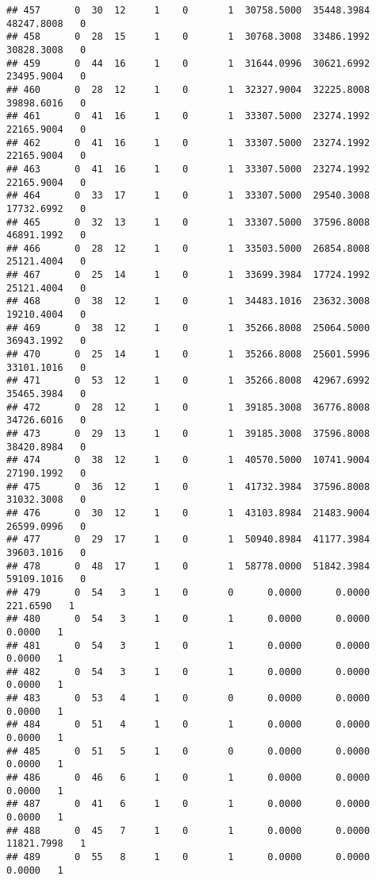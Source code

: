 \documentclass[
]{article}
\begin{document}
\begin{enumerate}
\begin{verbatim}
## 457      0  30  12     1    0       1  30758.5000  35448.3984  48247.8008   0
## 458      0  28  15     1    0       1  30768.3008  33486.1992  30828.3008   0
## 459      0  44  16     1    0       1  31644.0996  30621.6992  23495.9004   0
## 460      0  28  12     1    0       1  32327.9004  32225.8008  39898.6016   0
## 461      0  41  16     1    0       1  33307.5000  23274.1992  22165.9004   0
## 462      0  41  16     1    0       1  33307.5000  23274.1992  22165.9004   0
## 463      0  41  16     1    0       1  33307.5000  23274.1992  22165.9004   0
## 464      0  33  17     1    0       1  33307.5000  29540.3008  17732.6992   0
## 465      0  32  13     1    0       1  33307.5000  37596.8008  46891.1992   0
## 466      0  28  12     1    0       1  33503.5000  26854.8008  25121.4004   0
## 467      0  25  14     1    0       1  33699.3984  17724.1992  25121.4004   0
## 468      0  38  12     1    0       1  34483.1016  23632.3008  19210.4004   0
## 469      0  38  12     1    0       1  35266.8008  25064.5000  36943.1992   0
## 470      0  25  14     1    0       1  35266.8008  25601.5996  33101.1016   0
## 471      0  53  12     1    0       1  35266.8008  42967.6992  35465.3984   0
## 472      0  28  12     1    0       1  39185.3008  36776.8008  34726.6016   0
## 473      0  29  13     1    0       1  39185.3008  37596.8008  38420.8984   0
## 474      0  38  12     1    0       1  40570.5000  10741.9004  27190.1992   0
## 475      0  36  12     1    0       1  41732.3984  37596.8008  31032.3008   0
## 476      0  30  12     1    0       1  43103.8984  21483.9004  26599.0996   0
## 477      0  29  17     1    0       1  50940.8984  41177.3984  39603.1016   0
## 478      0  48  17     1    0       1  58778.0000  51842.3984  59109.1016   0
## 479      0  54   3     1    0       0      0.0000      0.0000    221.6590   1
## 480      0  54   3     1    0       1      0.0000      0.0000      0.0000   1
## 481      0  54   3     1    0       1      0.0000      0.0000      0.0000   1
## 482      0  54   3     1    0       1      0.0000      0.0000      0.0000   1
## 483      0  53   4     1    0       0      0.0000      0.0000      0.0000   1
## 484      0  51   4     1    0       1      0.0000      0.0000      0.0000   1
## 485      0  51   5     1    0       0      0.0000      0.0000      0.0000   1
## 486      0  46   6     1    0       1      0.0000      0.0000      0.0000   1
## 487      0  41   6     1    0       1      0.0000      0.0000      0.0000   1
## 488      0  45   7     1    0       1      0.0000      0.0000  11821.7998   1
## 489      0  55   8     1    0       1      0.0000      0.0000      0.0000   1

\end{verbatim}
\end{enumerate}
\end{document}
